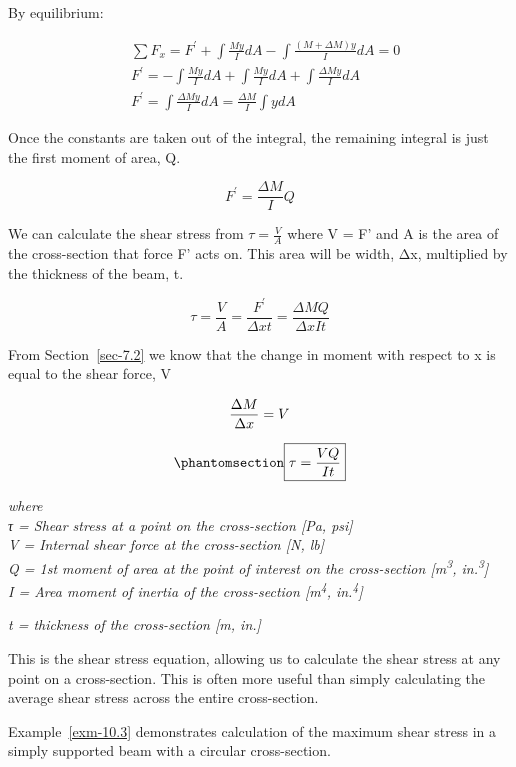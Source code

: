 \documentclass[
  letterpaper,
  DIV=11,
  numbers=noendperiod]{scrreprt}
\theoremstyle{definition}
\theoremstyle{remark}
\begin{document}
By equilibrium:

\[
\begin{aligned}
& \sum F_x=F^{\prime}+\int \frac{M y}{I} d A-\int \frac{(M+\Delta M) y}{I} d A=0 \\
& F^{\prime}=-\int \frac{M y}{I} d A+\int \frac{M y}{I} d A+\int \frac{\Delta M y}{I} d A \\
& F^{\prime}=\int \frac{\Delta M y}{I} d A=\frac{\Delta M}{I} \int y d A
\end{aligned}
\]

Once the constants are taken out of the integral, the remaining integral
is just the first moment of area, Q.

\[
F^{\prime}=\frac{\Delta M}{I} Q
\]

We can calculate the shear stress from \(\tau=\frac{V}{A}\) where V = F'
and A is the area of the cross-section that force F' acts on. This area
will be width, Δx, multiplied by the thickness of the beam, t.

\[
\tau=\frac{V}{A}=\frac{F^{\prime}}{\Delta x t}=\frac{\Delta M Q}{\Delta x I t}
\]

From Section~\ref{sec-7.2} we know that the change in moment with
respect to x is equal to the shear force, V

\[
\frac{\Delta M}{\Delta x}=V \\
\]

\begin{equation}\phantomsection\label{eq-10.2}{
\boxed{\tau=\frac{VQ}{It}}
}\end{equation}

\emph{where}\\
\emph{τ = Shear stress at a point on the cross-section {[}Pa, psi{]}}\\
\emph{V = Internal shear force at the cross-section {[}N, lb{]}}\\
\emph{Q = 1st moment of area at the point of interest on the
cross-section {[}m\textsuperscript{3}, in.\textsuperscript{3}{]}}\\
\emph{I = Area moment of inertia of the cross-section
{[}m\textsuperscript{4}, in.\textsuperscript{4}{]}}

\emph{t = thickness of the cross-section {[}m, in.{]}}

This is the shear stress equation, allowing us to calculate the shear
stress at any point on a cross-section. This is often more useful than
simply calculating the average shear stress across the entire
cross-section.

Example~\ref{exm-10.3} demonstrates calculation of the maximum shear
stress in a simply supported beam with a circular cross-section.
\end{document}
